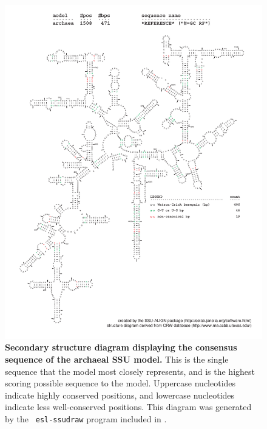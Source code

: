 \begin{figure}
\begin{center}
\includegraphics[width=5.7in]{Figures/archaea-0p1-rf}
\end{center}
\caption[Secondary structure diagram displaying the consensus sequence
  of the archaeal SSU model]{\textbf{Secondary structure diagram displaying the
  consensus sequence of the archaeal SSU model.} 
  This is the single sequence that the model 
  most closely represents, and is the highest scoring possible
  sequence to the model. Uppercase nucleotides indicate highly conserved positions,
  and lowercase nucleotides indicate less well-conserved positions.
  This diagram was generated by the {\tt
  esl-ssudraw} program included in .}
\label{fig:arcrf}
\end{figure}

